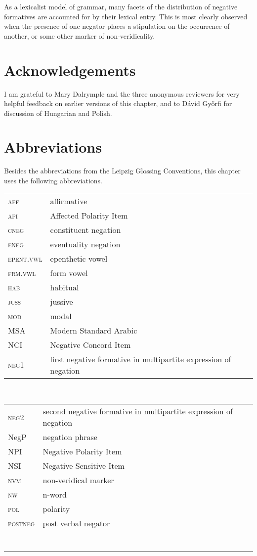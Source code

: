 \documentclass[output=paper,hidelinks]{langscibook}
\begin{document}
As a lexicalist model of grammar, many facets of the distribution of negative formatives are accounted for by their lexical entry. This is most clearly observed when the presence of one negator places a stipulation on the occurrence of another, or some other marker of non-veridicality.


\section*{Acknowledgements}

I am grateful to Mary Dalrymple and the three anonymous reviewers for very helpful feedback on earlier versions of this chapter, and to Dávid Győrfi for discussion of Hungarian and Polish.

\section*{Abbreviations}

Besides the abbreviations from the Leipzig Glossing Conventions, this
chapter uses the following abbreviations.\medskip

\noindent\begin{tabularx}{.45\textwidth}{lQ}
\textsc{aff}  & affirmative \\
\textsc{api}  & Affected Polarity Item \\
\textsc{cneg} & constituent negation \\
\textsc{eneg} & eventuality negation \\
\textsc{epent.vwl} & epenthetic vowel \\
\textsc{frm.vwl} & form vowel \\
\textsc{hab} & habitual \\
\textsc{juss} & jussive \\
\textsc{mod} & modal \\
MSA & Modern Standard Arabic \\
NCI & Negative Concord Item \\
\textsc{neg1} & first negative formative in multipartite expression of negation \\
\end{tabularx}~~\begin{tabularx}{.45\textwidth}{lQ}
\textsc{neg2} & second negative formative in multipartite expression of negation \\
NegP & negation phrase \\
NPI & Negative Polarity Item \\
NSI & Negative Sensitive Item \\
\textsc{nvm} & non-veridical marker \\
\textsc{nw} & n-word \\
\textsc{pol} & polarity \\
\textsc{postneg} & post verbal negator \\
\\
\\
\\
\\
\\
\\
\\
\end{tabularx}

\sloppy
\printbibliography[heading=subbibliography,notkeyword=this]
\end{document}
